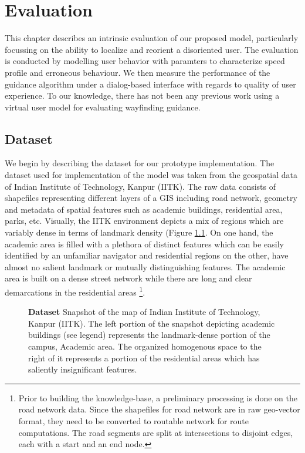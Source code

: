 \documentclass{iitkthesis}
\begin{document}
 \chapter{Evaluation}
This chapter describes an intrinsic evaluation of our proposed model, particularly focussing on the ability to localize and reorient a disoriented user. The evaluation is conducted by modelling user behavior with paramters to characterize speed profile and erroneous behaviour. We then measure the performance of the guidance algorithm under a dialog-based interface with regards to quality of user experience. To our knowledge, there has not been any previous work using a virtual user model for evaluating wayfinding guidance. 
 
 \label{evaluation}
 \section{Dataset}
We begin by describing the dataset for our prototype implementation. The dataset used for implementation of the model was taken from the geospatial data of Indian Institute of Technology, Kanpur (IITK). The raw data consists of shapefiles representing different layers of a GIS including road network, geometry and metadata of spatial features such as academic buildings, residential area, parks, etc. Visually, the IITK environment depicts a mix of regions which are variably dense in terms of landmark density (Figure \ref{fig:dataset}. On one hand, the academic area is filled with a plethora of distinct features which can be easily identified by an unfamiliar navigator and residential regions on the other, have almost no salient landmark or mutually distinguishing features. The academic area is built on a dense street network while there are long and clear demarcations in the residential areas
\footnote{Prior to building the knowledge-base, a preliminary processing is done on the road network data. Since the shapefiles for road network are in raw geo-vector format, they need to be converted to routable network for route computations. The road segments are split at intersections to disjoint edges, each with a start and an end node.}.
\begin{figure}
\centering
{}
\caption{\textbf{\textbf{Dataset}} Snapshot of the map of Indian Institute of Technology, Kanpur (IITK). The left portion of the snapshot depicting academic buildings (see legend) represents the landmark-dense portion of the campus, Academic area. The organized homogenous space to the right of it represents a portion of the residential areas which has saliently insignificant features.}
\label{fig:dataset}
 \end{figure} 
\end{document}
